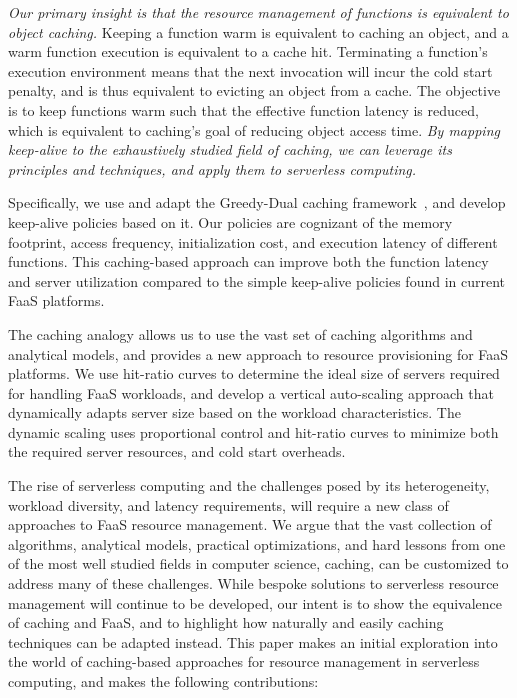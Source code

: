 \emph{Our primary insight is that the resource management of functions is equivalent to object caching.}
Keeping a function warm is equivalent to caching an object, and a warm function execution is equivalent to a cache hit. 
Terminating a function's execution environment means that the next invocation will incur the cold start penalty, and is thus equivalent to evicting an object from a cache. 
The objective is to keep functions warm such that the effective function latency is reduced, which is equivalent to caching's goal of reducing object access time.  
\emph{By mapping keep-alive to the exhaustively studied field of caching, we can leverage its  principles and techniques, and apply them to serverless computing.} 


Specifically, we use and adapt the Greedy-Dual caching framework~\cite{gdsf}, and develop keep-alive policies based on it. 
Our policies are cognizant of the memory footprint, access frequency,  initialization cost, and execution latency of different functions. 
This caching-based approach can improve both the function latency and server utilization compared to the simple keep-alive policies found in current FaaS platforms. 


The caching analogy allows us to use the vast set of caching algorithms and  analytical models, and provides a new approach to resource provisioning for FaaS platforms.
We use hit-ratio curves to determine the ideal size of servers required for handling FaaS workloads, and develop a vertical auto-scaling approach that dynamically adapts server size based on the workload characteristics.
The dynamic scaling uses proportional control and hit-ratio curves to minimize both the required server resources, and cold start overheads. 

The rise of serverless computing and the challenges posed by its heterogeneity, workload diversity, and latency requirements, will require a new class of approaches to FaaS resource management. 
We argue that the vast collection of algorithms, analytical models, practical optimizations, and hard lessons from one of the most well studied fields in computer science, caching, can be customized to address many of these challenges. 
While bespoke solutions to serverless resource management will continue to be developed, our intent is to show the equivalence of caching and FaaS, and to highlight how naturally and easily caching techniques can be adapted instead. 
This paper makes an initial exploration into the world of caching-based approaches for resource management in serverless computing, and makes the following contributions:


